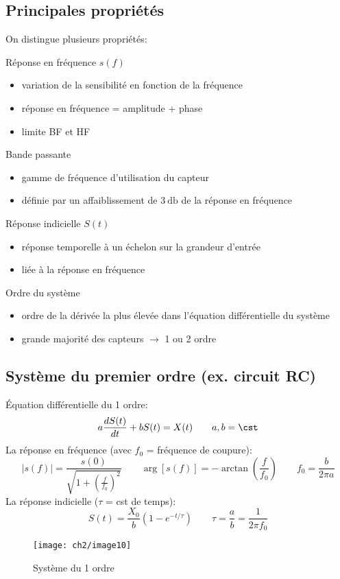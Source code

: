 \subsection{Principales propriétés}
On distingue plusieurs propriétés:
\begin{description}
	\item Réponse en fréquence $s(f)$
	\begin{itemize}
		\item variation de la sensibilité en fonction de la fréquence
		\item réponse en fréquence = amplitude + phase
		\item limite BF et HF
	\end{itemize}
	\item Bande passante
	\begin{itemize}
		\item gamme de fréquence d'utilisation du capteur
		\item définie par un affaiblissement de $\SI{3}{\decibel}$ de la réponse en fréquence
	\end{itemize}
	\item Réponse indicielle $S(t)$
	\begin{itemize}
		\item réponse temporelle à un échelon sur la grandeur d'entrée
		\item liée à la réponse en fréquence
	\end{itemize}
	\item Ordre du système
	\begin{itemize}
		\item ordre de la dérivée la plus élevée dans l'équation différentielle du système
		\item grande majorité des capteurs $\rightarrow$ 1 ou 2 ordre
	\end{itemize}
\end{description}
\subsection{Système du premier ordre (ex. circuit RC)}
Équation différentielle du 1 ordre:
\[
a\frac{d S(t)}{dt} + b S(t) = X(t)\qquad a, b=\cst
\]
La réponse en fréquence (avec $f_0$ = fréquence de coupure):
\[
|s(f)|=\frac{s(0)}{\sqrt{1+\left(\frac{f}{f_0}\right)^2}}\qquad \arg[s(f)] = -\arctan\left(\frac{f}{f_0}\right)\qquad f_0=\frac{b}{2\pi a}
\]
La réponse indicielle ($\tau$ = cst de temps):
\[
S(t) = \frac{X_0}{b}\left(1-e^{-t/\tau}\right)\qquad \tau =\frac{a}{b}=\frac{1}{2\pi f_0}
\]
\begin{figure}[H] 
	\centering 
	\texttt{[image: ch2/image10]} 
	\caption{Système du 1 ordre} 
\end{figure}
